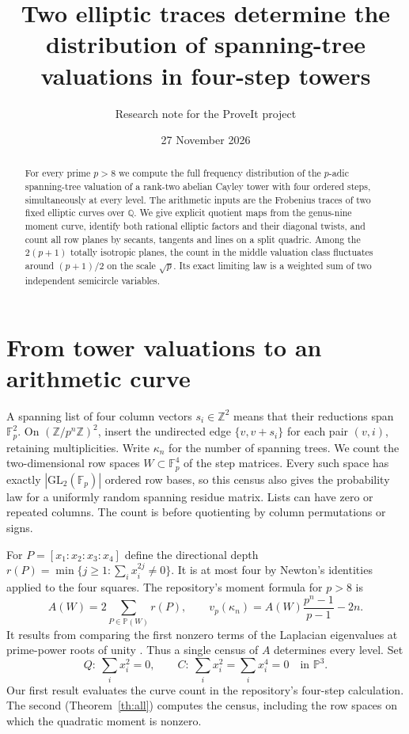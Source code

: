 \documentclass[11pt]{article}
\title{\vspace*{-0.45in}Two elliptic traces determine the distribution of spanning-tree valuations in four-step towers}
\author{Research note for the ProveIt project}
\date{27 November 2026\vspace{-0.13in}}
\newcommand{\F}{\mathbb F}\newcommand{\Q}{\mathbb Q}\newcommand{\PP}{\mathbb P}
\newcommand{\Z}{\mathbb Z}\newcommand{\Jac}{\operatorname{Jac}}
\begin{document}
\maketitle
\begin{abstract}
For every prime $p>8$ we compute the full frequency distribution of the
$p$-adic spanning-tree valuation of a rank-two abelian Cayley tower with
four ordered steps, simultaneously at every level. The arithmetic inputs
are the Frobenius traces of two fixed elliptic curves over $\Q$. We give
explicit quotient maps from the genus-nine moment curve, identify both
rational elliptic factors and their diagonal twists, and count all row
planes by secants, tangents and lines on a split quadric. Among the
$2(p+1)$ totally isotropic planes, the count in the middle valuation
class fluctuates around $(p+1)/2$ on the scale $\sqrt p$. Its exact
limiting law is a weighted sum of two independent semicircle variables.
\end{abstract}

\section{From tower valuations to an arithmetic curve}
A spanning list of four column vectors $s_i\in\Z^2$ means that their
reductions span $\F_p^2$. On $(\Z/p^n\Z)^2$, insert the undirected
edge $\{v,v+s_i\}$ for each pair $(v,i)$, retaining multiplicities.
Write $\kappa_n$ for the number of spanning trees. We count the
two-dimensional row spaces $W\subset\F_p^4$ of the step matrices.
Every such space has exactly $|\mathrm{GL}_2(\F_p)|$ ordered row bases,
so this census also gives the probability law for a uniformly random
spanning residue matrix. Lists can have zero or repeated columns.
The count is before quotienting by column permutations or signs.

For $P=[x_1:x_2:x_3:x_4]$ define the directional depth
$r(P)=\min\{j\ge1:\sum_i x_i^{2j}\ne0\}$. It is at most four by
Newton's identities applied to the four squares. The repository's
moment formula for $p>8$ is
\begin{equation}\label{eq:tower}
 A(W)=2\sum_{P\in\PP(W)}r(P),\qquad
 v_p(\kappa_n)= A(W)\frac{p^n-1}{p-1}-2n .
\end{equation}
It results from comparing the first nonzero terms of the Laplacian
eigenvalues at prime-power roots of unity \cite{article}. Thus a
single census of $A$ determines every level. Set
\[
 Q:\ \sum_i x_i^2=0,\qquad C:\ \sum_i x_i^2=\sum_i x_i^4=0
 \quad\text{in }\PP^3.
\]
Our first result evaluates the curve count in the repository's
four-step calculation. The second (Theorem~\ref{th:all}) computes
the census, including the row spaces on which the quadratic moment
is nonzero.
\end{document}
